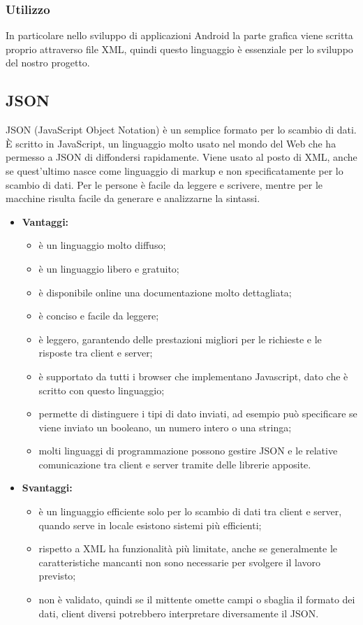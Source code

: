 	\subsubsection{Utilizzo}
	In particolare nello sviluppo di applicazioni Android la parte grafica viene scritta proprio attraverso file XML, quindi questo linguaggio è essenziale per lo sviluppo del nostro progetto.


\subsection{JSON}
	JSON (JavaScript Object Notation) è un semplice formato per lo scambio di dati. È scritto in JavaScript, un linguaggio molto usato nel mondo del Web che ha permesso a JSON di diffondersi rapidamente. Viene usato al posto di XML, anche se quest'ultimo nasce come linguaggio di markup e non specificatamente per lo scambio di dati. Per le persone è facile da leggere e scrivere, mentre per le macchine risulta facile da generare e analizzarne la sintassi.

	\begin{itemize}
		\item \textbf{Vantaggi:}
			\begin{itemize}
				\item è un linguaggio molto diffuso;
				\item è un linguaggio libero e gratuito;
				\item è disponibile online una documentazione molto dettagliata;
				\item è conciso e facile da leggere;
				\item è leggero, garantendo delle prestazioni migliori per le richieste e le risposte tra client e server;
				\item è supportato da tutti i browser che implementano Javascript, dato che è scritto con questo linguaggio;
				\item permette di distinguere i tipi di dato inviati, ad esempio può specificare se viene inviato un booleano, un numero intero o una stringa;
				\item molti linguaggi di programmazione possono gestire JSON e le relative comunicazione tra client e server tramite delle librerie apposite.
			\end{itemize}
		\item \textbf{Svantaggi:}
			\begin{itemize}
				\item è un linguaggio efficiente solo per lo scambio di dati tra client e server, quando serve in locale esistono sistemi più efficienti;
				\item rispetto a XML ha funzionalità più limitate, anche se generalmente le caratteristiche mancanti non sono necessarie per svolgere il lavoro previsto;
				\item non è validato, quindi se il mittente omette campi o sbaglia il formato dei dati, client diversi potrebbero interpretare diversamente il JSON.
			\end{itemize}
	\end{itemize}
